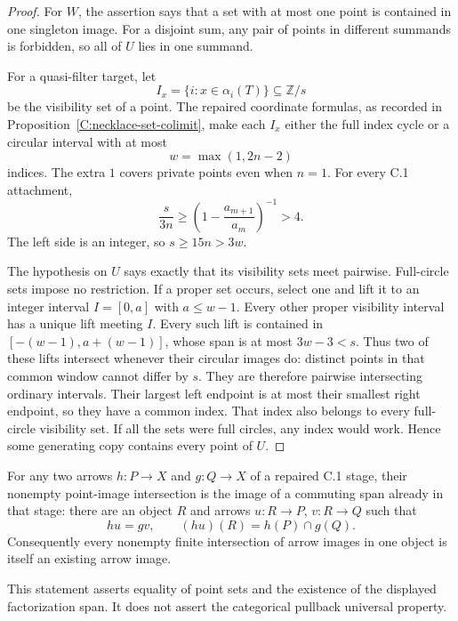 \begin{proof}
For $W$, the assertion says that a set with at most one point is
contained in one singleton image.  For a disjoint sum, any pair
of points in different summands is forbidden, so all of $U$ lies
in one summand.

For a quasi-filter target, let
\[
                   I_x=\{i:x\in\alpha_i(T)\}
                              \subseteq\mathbb Z/s
\]
be the visibility set of a point.  The repaired coordinate
formulas, as recorded in Proposition~\ref{C:necklace-set-colimit},
make each $I_x$ either the full index cycle or a circular interval
with at most
\[
                              w=\max(1,2n-2)
\]
indices.  The extra $1$ covers private points even when $n=1$.
For every C.1 attachment,
\[
 \frac{s}{3n}\geq
 \left(1-\frac{a_{m+1}}{a_m}\right)^{-1}>4.
\]
The left side is an integer, so $s\geq15n>3w$.

The hypothesis on $U$ says exactly that its visibility sets meet
pairwise.  Full-circle sets impose no restriction.  If a proper
set occurs, select one and lift it to an integer interval
$I=[0,a]$ with $a\leq w-1$.  Every other proper visibility interval
has a unique lift meeting $I$.  Every such lift is contained in
$[-(w-1),a+(w-1)]$, whose span is at most $3w-3<s$.
Thus two of these lifts intersect whenever their circular images
do: distinct points in that common window cannot differ by $s$.
They are therefore pairwise intersecting ordinary intervals.
Their largest left endpoint is at most their smallest right
endpoint, so they have a common index.  That index also belongs
to every full-circle visibility set.  If all the sets were full
circles, any index would work.  Hence some generating copy
contains every point of $U$.
\end{proof}

\begin{proposition}
\label{C:arrow-image-intersections}
For any two arrows $h:P\to X$ and $g:Q\to X$ of a repaired C.1
stage, their nonempty point-image intersection is the image of a
commuting span already in that stage: there are an object $R$ and
arrows $u:R\to P$, $v:R\to Q$ such that
\[
             hu=gv,\qquad (hu)(R)=h(P)\cap g(Q).
\]
Consequently every nonempty finite intersection of arrow images
in one object is itself an existing arrow image.

This statement asserts equality of point sets and the existence
of the displayed factorization span.  It does not assert the
categorical pullback universal property.
\end{proposition}

